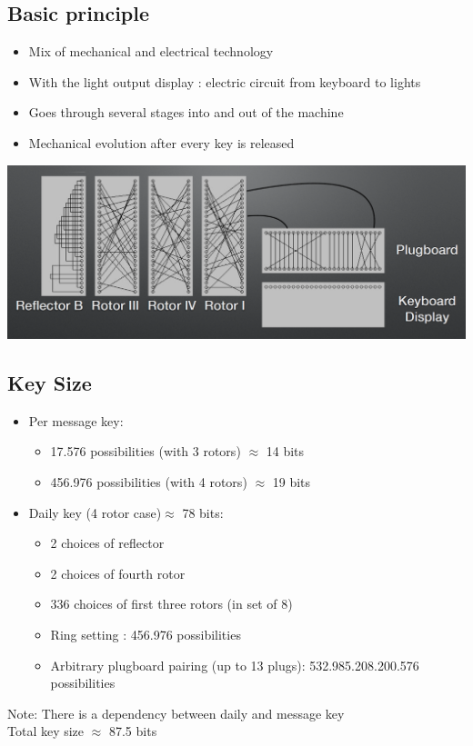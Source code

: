     	\subsection{Basic principle}
    		\begin{itemize}
    			\item Mix of mechanical and electrical technology
    			\item With the light output display : electric circuit from keyboard to lights
    			\item Goes through several stages into and out of the machine
    			\item Mechanical evolution after every key is released
    		\end{itemize}
    		\begin{center}
         	 	\includegraphics[width=180mm]{Graphics/Historical Ciphers/Enigma.png}\newline
       		\end{center}
       
       	\subsection{Key Size}
       		\begin{itemize}
       			\item Per message key:
       				\begin{itemize}
       					\item 17.576 possibilities (with 3 rotors) $\approx$ 14 bits
       					\item 456.976 possibilities (with 4 rotors) $\approx$ 19 bits
       				\end{itemize}
       			\item Daily key (4 rotor case)$\approx$ 78 bits:
       				\begin{itemize}
       					\item 2 choices of reflector
       					\item 2 choices of fourth rotor
       					\item 336 choices of first three rotors (in set of 8)
       					\item Ring setting : 456.976 possibilities
       					\item Arbitrary plugboard pairing (up to 13 plugs):
       					532.985.208.200.576 possibilities
       				\end{itemize}
       		\end{itemize}
       		Note: There is a dependency between daily and message key\\
       		Total key size $\approx$ 87.5 bits
       	
